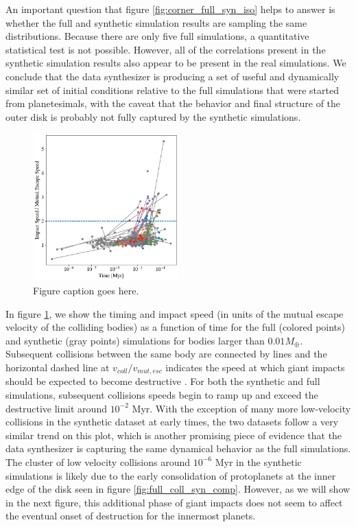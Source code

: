 An important question that figure  \ref{fig:corner_full_syn_iso} helps to answer is whether the full and synthetic simulation results are sampling the same distributions. Because there are only five full simulations, a quantitative statistical test is not possible. However, all of the correlations present in the synthetic simulation results also appear to be present in the real simulations. We conclude that the data synthesizer is producing a set of useful and dynamically similar set of initial conditions relative to the full simulations that were started from planetesimals, with the caveat that the behavior and final structure of the outer disk is probably not fully captured by the synthetic simulations.

\begin{figure}
\begin{center}
    \includegraphics[width=0.5\textwidth]{figures/stip/impact_syn_comp.png}
    \caption{Figure caption goes here.\label{fig:impact_syn_comp}}
\end{center}
\end{figure}

In figure \ref{fig:impact_syn_comp}, we show the timing and impact speed (in units of the mutual escape velocity of the colliding bodies) as a function of time for the full (colored points) and synthetic (gray points) simulations for bodies larger than $0.01 M_{\oplus}$. Subsequent collisions between the same body are connected by lines and the horizontal dashed line at $v_{coll}/v_{mut, esc}$ indicates the speed at which giant impacts should be expected to become destructive \cite{marcus09}. For both the synthetic and full simulations, subsequent collisions speeds begin to ramp up and exceed the destructive limit around $10^{-2}$ Myr. With the exception of many more low-velocity collisions in the synthetic dataset at early times, the two datasets follow a very similar trend on this plot, which is another promising piece of evidence that the data synthesizer is capturing the same dynamical behavior as the full simulations. The cluster of low velocity collisions around $10^{-6}$ Myr in the synthetic simulations is likely due to the early consolidation of protoplanets at the inner edge of the disk seen in figure \ref{fig:full_coll_syn_comp}. However, as we will show in the next figure, this additional phase of giant impacts does not seem to affect the eventual onset of destruction for the innermost planets.

